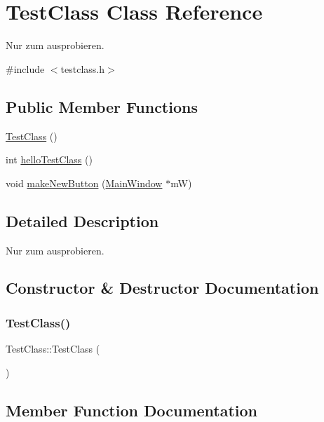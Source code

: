 \hypertarget{class_test_class}{}\section{Test\+Class Class Reference}
\label{class_test_class}


Nur zum ausprobieren.  




{\ttfamily \#include $<$testclass.\+h$>$}

\subsection*{Public Member Functions}
\begin{DoxyCompactItemize}
\item 
\mbox{\hyperlink{class_test_class_a09903432ed60c7c38f1beccc4cf18987}{Test\+Class}} ()
\item 
int \mbox{\hyperlink{class_test_class_a842a304e200248cadf04d06126b51124}{hello\+Test\+Class}} ()
\item 
void \mbox{\hyperlink{class_test_class_a42a56dd831d10b5580fe9fc4e973f7de}{make\+New\+Button}} (\mbox{\hyperlink{class_main_window}{Main\+Window}} $\ast$mW)
\end{DoxyCompactItemize}


\subsection{Detailed Description}
Nur zum ausprobieren. 

\subsection{Constructor \& Destructor Documentation}
\mbox{\label{class_test_class_a09903432ed60c7c38f1beccc4cf18987}} 
\subsubsection{\texorpdfstring{Test\+Class()}{TestClass()}}
{\footnotesize\ttfamily Test\+Class\+::\+Test\+Class (\begin{DoxyParamCaption}{ }\end{DoxyParamCaption})}



\subsection{Member Function Documentation}
\mbox{\label{class_test_class_a842a304e200248cadf04d06126b51124}} 
